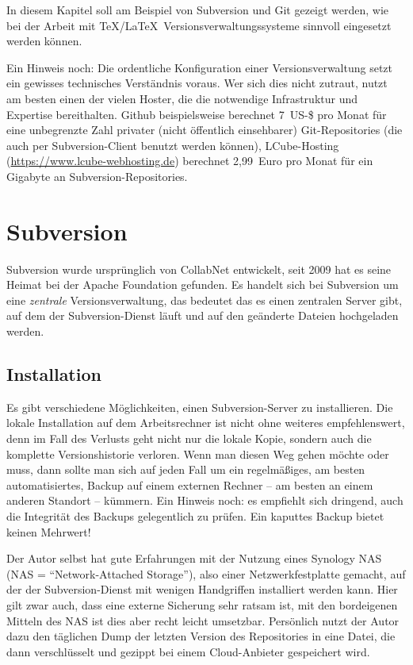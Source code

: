 In diesem Kapitel soll am Beispiel von Subversion und Git gezeigt werden, wie bei der Arbeit mit \TeX/\LaTeX\ Versionsverwaltungssysteme sinnvoll eingesetzt werden können.

Ein Hinweis noch: Die ordentliche Konfiguration einer Versionsverwaltung setzt ein gewisses technisches Verständnis voraus. Wer sich dies nicht zutraut, nutzt am besten einen der vielen Hoster, die die notwendige Infrastruktur und Expertise bereithalten. Github beispielsweise berechnet 7~US-\$ pro Monat für eine unbegrenzte Zahl privater (nicht öffentlich einsehbarer) Git-Repositories (die auch per Subversion-Client benutzt werden können), LCube-Hosting (\url{https://www.lcube-webhosting.de}) berechnet 2,99~Euro pro Monat für ein Gigabyte an Subversion-Repositories.

\section{Subversion}

Subversion wurde ursprünglich von CollabNet entwickelt, seit 2009 hat es seine Heimat bei der Apache Foundation gefunden. Es handelt sich bei Subversion um eine \textit{zentrale} Versionsverwaltung, das bedeutet das es einen zentralen Server gibt, auf dem der Subversion-Dienst läuft und auf den geänderte Dateien hochgeladen werden.

\subsection{Installation}

Es gibt verschiedene Möglichkeiten, einen Subversion-Server zu installieren. Die lokale Installation auf dem Arbeitsrechner ist nicht ohne weiteres empfehlenswert, denn im Fall des Verlusts geht nicht nur die lokale Kopie, sondern auch die komplette Versionshistorie verloren. Wenn man diesen Weg gehen möchte oder muss, dann sollte man sich auf jeden Fall um ein regelmäßiges, am besten automatisiertes, Backup auf einem externen Rechner -- am besten an einem anderen Standort -- kümmern. Ein Hinweis noch: es empfiehlt sich dringend, auch die Integrität des Backups gelegentlich zu prüfen. Ein kaputtes Backup bietet keinen Mehrwert!

Der Autor selbst hat gute Erfahrungen mit der Nutzung eines Synology NAS (NAS = \enquote{Network-Attached Storage}), also einer Netzwerkfestplatte gemacht, auf der der Subversion-Dienst mit wenigen Handgriffen installiert werden kann. Hier gilt zwar auch, dass eine externe Sicherung sehr ratsam ist, mit den bordeigenen Mitteln des NAS ist dies aber recht leicht umsetzbar. Persönlich nutzt der Autor dazu den täglichen Dump der letzten Version des Repositories in eine Datei, die dann verschlüsselt und gezippt bei einem Cloud-Anbieter gespeichert wird.

